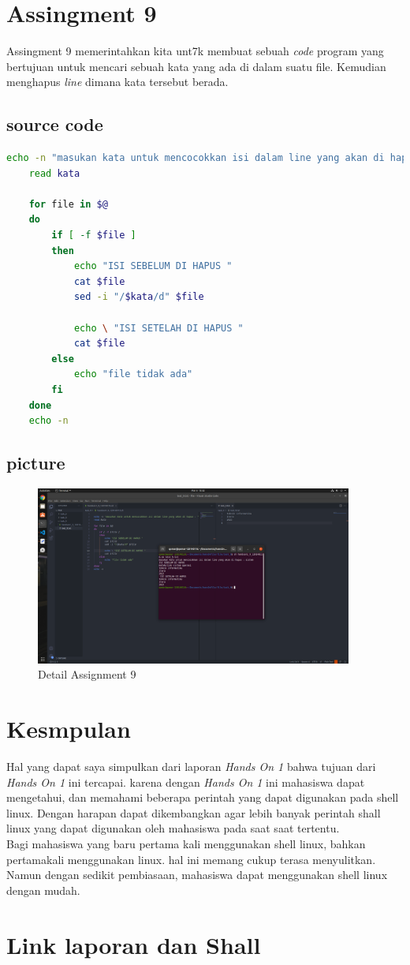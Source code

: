 \documentclass[11pt,a4paper]{article}
\begin{document}
\newpage
\section{Assingment 9}
Assingment 9 memerintahkan kita unt7k membuat sebuah \textit{code} program yang bertujuan untuk mencari sebuah kata yang ada di dalam suatu file.
Kemudian menghapus \textit{line} dimana kata tersebut berada.
\subsection*{source code}
\begin{lstlisting}[language=bash, caption={source code Assingment 9}]
	echo -n "masukan kata untuk mencocokkan isi dalam line yang akan di hapus : "
	read kata

	for file in $@
	do
		if [ -f $file ]
		then
			echo "ISI SEBELUM DI HAPUS "
			cat $file
			sed -i "/$kata/d" $file

			echo \ "ISI SETELAH DI HAPUS "
			cat $file
		else 
			echo "file tidak ada"
		fi
	done
	echo -n
\end{lstlisting}

\subsection*{picture}
\begin{figure}[h]
	\centering
	\includegraphics[width=0.93\textwidth]{figure/task_9.png}
	\caption{Detail Assignment 9}
\end{figure}


\newpage
\section{Kesmpulan}
Hal yang dapat saya simpulkan dari laporan \textit{Hands On 1} bahwa tujuan dari \textit{Hands On 1} ini tercapai. karena dengan \textit{Hands On 1} ini mahasiswa dapat mengetahui, dan memahami beberapa perintah yang dapat digunakan pada shell linux.
Dengan harapan dapat dikembangkan agar lebih banyak perintah shall linux yang dapat digunakan oleh mahasiswa pada saat saat tertentu.\\
Bagi mahasiswa yang baru pertama kali menggunakan shell linux, bahkan pertamakali menggunakan linux. hal ini memang cukup terasa menyulitkan. Namun dengan sedikit pembiasaan, mahasiswa dapat menggunakan shell linux dengan mudah.

\section{Link laporan dan Shall}

\newpage


\end{document}
